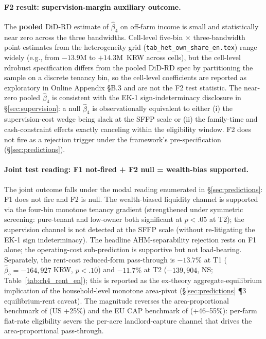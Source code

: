\documentclass[12pt, a4paper]{article}
\begin{document}
\paragraph{F2 result: supervision-margin auxiliary outcome.} The \textbf{pooled} DiD-RD estimate of $\hat\beta_4$ on off-farm income is small and statistically near zero across the three bandwidths. Cell-level five-bin $\times$ three-bandwidth point estimates from the heterogeneity grid (\texttt{tab\_het\_own\_share\_en.tex}) range widely (e.g., from $-13.9$M to $+14.3$M~KRW across cells), but the cell-level rdrobust specification differs from the pooled DiD-RD spec by partitioning the sample on a discrete tenancy bin, so the cell-level coefficients are reported as exploratory in Online Appendix \S B.3 and are not the F2 test statistic. The near-zero pooled $\hat\beta_4$ is consistent with the EK-1 sign-indeterminacy disclosure in \S\ref{sec:supervision}: a null $\hat\beta_4$ is observationally equivalent to either (i) the supervision-cost wedge being slack at the SFFP scale or (ii) the family-time and cash-constraint effects exactly canceling within the eligibility window. F2 does not fire as a rejection trigger under the framework's pre-specification (\S\ref{sec:predictions}).

\paragraph{Joint test reading: F1 not-fired + F2 null = wealth-bias supported.} The joint outcome falls under the modal reading enumerated in \S\ref{sec:predictions}: F1 does not fire and F2 is null. The wealth-biased liquidity channel is supported via the four-bin monotone tenancy gradient (strengthened under symmetric screening: pure-tenant and low-owner both significant at $p < .05$ at T2); the supervision channel is not detected at the SFFP scale (without re-litigating the EK-1 sign indeterminacy). The headline AHM-separability rejection rests on F1 alone; the operating-cost sub-prediction is supportive but not load-bearing. Separately, the rent-cost reduced-form pass-through is $-13.7\%$ at T1 ($\hat\beta_5 = -164{,}927$ KRW, $p < .10$) and $-11.7\%$ at T2 ($-139{,}904$, NS; Table~\ref{tab:ch4_rent_en}); this is reported as the ex-theory aggregate-equilibrium implication of the household-level monotone area-pivot (\S\ref{sec:predictions} ¶3 equilibrium-rent caveat). The magnitude reverses the area-proportional benchmark of \citet{Kirwan2009_rentcap} (US +25\%) and the EU CAP benchmark of \citet{BaldoniCiaian2023_eucap} (+46--55\%): per-farm flat-rate eligibility severs the per-acre landlord-capture channel that drives the area-proportional pass-through.
\end{document}
